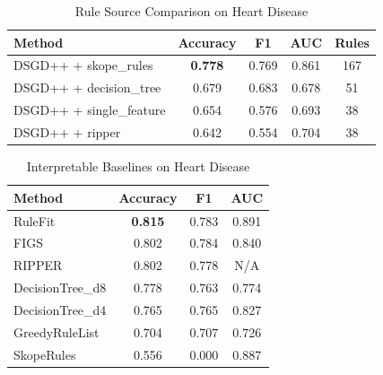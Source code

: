 
\begin{table}[htbp]
\centering
\caption{Rule Source Comparison on Heart Disease}
\label{tab:e1_heart_disease}
\begin{tabular}{lcccc}
\toprule
Method & Accuracy & F1 & AUC & Rules \\
\midrule
DSGD++ + skope_rules & \textbf{0.778} & 0.769 & 0.861 & 167 \\
DSGD++ + decision_tree & 0.679 & 0.683 & 0.678 & 51 \\
DSGD++ + single_feature & 0.654 & 0.576 & 0.693 & 38 \\
DSGD++ + ripper & 0.642 & 0.554 & 0.704 & 38 \\
\bottomrule
\end{tabular}
\end{table}

\begin{table}[htbp]
\centering
\caption{Interpretable Baselines on Heart Disease}
\label{tab:e5_heart_disease}
\begin{tabular}{lccc}
\toprule
Method & Accuracy & F1 & AUC \\
\midrule
RuleFit & \textbf{0.815} & 0.783 & 0.891 \\
FIGS & 0.802 & 0.784 & 0.840 \\
RIPPER & 0.802 & 0.778 & N/A \\
DecisionTree_d8 & 0.778 & 0.763 & 0.774 \\
DecisionTree_d4 & 0.765 & 0.765 & 0.827 \\
GreedyRuleList & 0.704 & 0.707 & 0.726 \\
SkopeRules & 0.556 & 0.000 & 0.887 \\
\bottomrule
\end{tabular}
\end{table}

